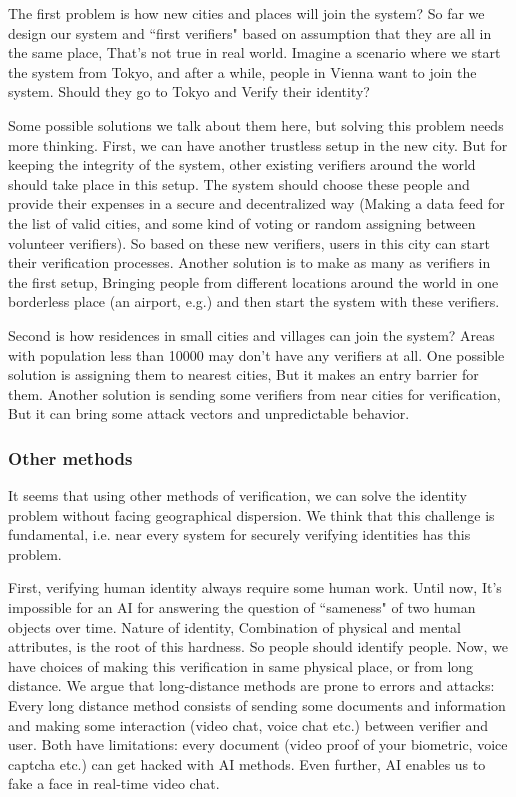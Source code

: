 \documentclass[conference]{IEEEtran}
\begin{document}
The first problem is how new cities and places will join the system? So far we design our system and ``first verifiers" based on assumption that they are all in the same place, That's not true in real world. Imagine a scenario where we start the system from Tokyo, and after a while, people in Vienna want to join the system. Should they go to Tokyo and Verify their identity?


Some possible solutions we talk about them here, but solving this problem needs more thinking. First, we can have another trustless setup in the new city. But for keeping the integrity of the system, other existing verifiers around the world should take place in this setup. The system should choose these people and provide their expenses in a secure and decentralized way (Making a data feed for the list of valid cities, and some kind of voting or random assigning between volunteer verifiers). So based on these new verifiers, users in this city can start their verification processes. Another solution is to make as many as verifiers in the first setup, Bringing people from different locations around the world in one borderless place (an airport, e.g.) and then start the system with these verifiers. 


Second is how residences in small cities and villages can join the system? Areas with population less than 10000  may don't have any verifiers at all. One possible solution is assigning them to nearest cities, But it makes an entry barrier for them. Another solution is sending some verifiers from near cities for verification, But it can bring some attack vectors and unpredictable behavior. 

\subsubsection*{Other methods}
It seems that using other methods of verification, we can solve the identity problem without facing geographical dispersion. We think that this challenge is fundamental, i.e. near every system for securely verifying identities has this problem.


First, verifying human identity always require some human work. Until now, It's impossible for an AI for answering the question of ``sameness" of two human objects over time. Nature of identity, Combination of physical and mental attributes, is the root of this hardness. So people should identify people. Now, we have choices of making this verification in same physical place, or from long distance. We argue that long-distance methods are prone to errors and attacks: Every long distance method consists of sending some documents and information and making some interaction (video chat, voice chat etc.) between verifier and user. Both have limitations: every document (video proof of your biometric, voice captcha etc.) can get hacked with AI methods. Even further, AI enables us to fake a face in real-time video chat.
\end{document}
